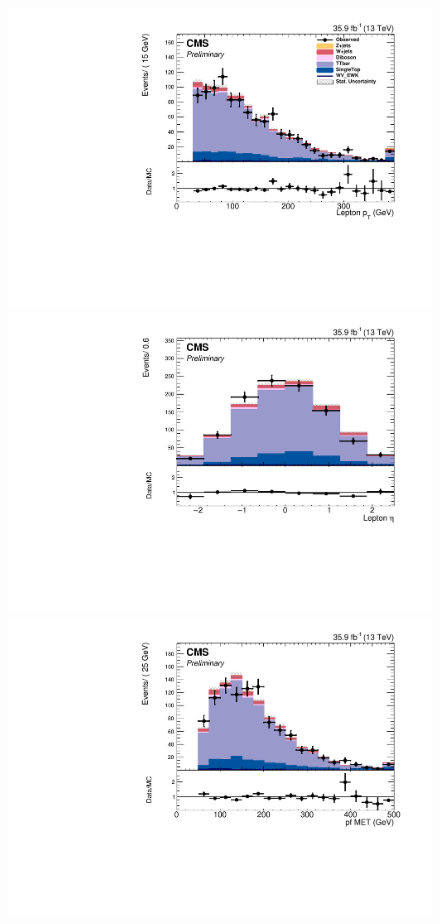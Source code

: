 \begin{figure}[htb]
\centering
\includegraphics[width=\cmsFigWidth]{Plots/plots/DibosonBoostedElMuCuts13TeV_TTBarControlRegion_CHS_lepton_pt.pdf}
\includegraphics[width=\cmsFigWidth]{Plots/plots/DibosonBoostedElMuCuts13TeV_TTBarControlRegion_CHS_lepton_eta.pdf}
\includegraphics[width=\cmsFigWidth]{Plots/plots/DibosonBoostedElMuCuts13TeV_TTBarControlRegion_CHS_pfMET_Corr.pdf}

\end{figure}
